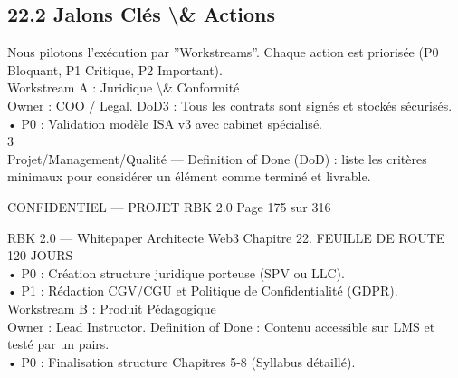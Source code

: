 \documentclass[12pt,landscape,a4paper]{article}
\newenvironment{confidential}
{\begin{tcolorbox}[
    colback=rbkred!5!white,
    colframe=rbkred!75!black,
    title=CONFIDENTIEL,
    fonttitle=\bfseries\color{white},
    coltitle=rbkred!75!black,
    breakable,
    enhanced,
    frame hidden,
    borderline west={2pt}{0pt}{rbkred!75!black}
]}
{\end{tcolorbox}}
\begin{document}
\subsection{22.2 Jalons Clés \textbackslash{}& Actions}
Nous pilotons l’exécution par ”Workstreams”. Chaque action est priorisée (P0 Bloquant, P1 Critique, P2 Important).\\
\vspace{0.5em}
Workstream A : Juridique \textbackslash{}& Conformité\\
\vspace{0.5em}
Owner : COO / Legal. DoD3 : Tous les contrats sont signés et stockés sécurisés.\\
\vspace{0.5em}
• P0 : Validation modèle ISA v3 avec cabinet spécialisé.\\
3\\
Projet/Management/Qualité — Definition of Done (DoD) : liste les critères minimaux pour considérer un élément comme terminé et livrable.\\
\vspace{0.5em}
\vspace{0.5em}
\vspace{0.5em}
\vspace{0.5em}
\begin{confidential}CONFIDENTIEL — PROJET RBK 2.0                                                   Page 175 sur 316\end{confidential}
RBK 2.0 — Whitepaper Architecte Web3                                                                            Chapitre 22. FEUILLE DE ROUTE 120 JOURS\\
\vspace{0.5em}
\vspace{0.5em}
• P0 : Création structure juridique porteuse (SPV ou LLC).\\
\vspace{0.5em}
• P1 : Rédaction CGV/CGU et Politique de Confidentialité (GDPR).\\
\vspace{0.5em}
Workstream B : Produit Pédagogique\\
\vspace{0.5em}
Owner : Lead Instructor. Definition of Done : Contenu accessible sur LMS et testé par un pairs.\\
\vspace{0.5em}
• P0 : Finalisation structure Chapitres 5-8 (Syllabus détaillé).\\
\vspace{0.5em}
\end{document}
